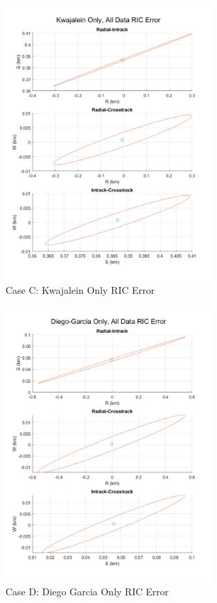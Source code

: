 \documentclass[conf]{new-aiaa}
\begin{document}
\begin{figure}[H]
	\centering
	\includegraphics[width=0.7\textwidth]{caseC_RICerr.png}
	\caption{Case C: Kwajalein Only RIC Error}
\end{figure}

\begin{figure}[H]
	\centering
	\includegraphics[width=0.7\textwidth]{caseD_RICerr.png}
	\caption{Case D: Diego Garcia Only RIC Error}
\end{figure}
\end{document}
